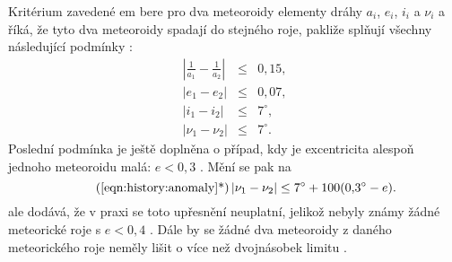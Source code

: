 Kritérium zavedené \citeauthor{radiosurvey}em bere pro dva meteoroidy elementy dráhy $a_i$, $e_i$, $i_i$ a $\nu_i$ a říká, že tyto dva meteoroidy spadají do stejného roje, pakliže splňují všechny následující podmínky \cite{radiosurvey}:
\begin{eqnarray}
    \left|\frac{1}{a_1}-\frac{1}{a_2}\right| &\le& 0{,}15 \text{,}\\
    \left|e_1-e_2\right| &\le& 0{,}07 \text{,}\\
    \left|i_1-i_2\right| &\le& 7^\circ \text{,}\\
    \left|\nu_1-\nu_2\right| &\le& 7^\circ \label{eqn:history:anomaly}\text{.}
\end{eqnarray}
Poslední podmínka je ještě doplněna o případ, kdy je excentricita alespoň jednoho meteoroidu malá: $e<0{,}3$ \cite{radiosurvey}. Mění se pak na \cite{radiosurvey}
\begin{equation}
    \tag{\ref{eqn:history:anomaly}*}
    \left|\nu_1-\nu_2\right| \le 7^\circ+100(0{,}3^\circ-e)\text{.}
\end{equation}
\citeauthor{radiosurvey} ale dodává, že v praxi se toto upřesnění neuplatní, jelikož nebyly známy žádné meteorické roje s $e<0{,}4$ \cite{radiosurvey}. Dále by se žádné dva meteoroidy z daného meteorického roje neměly lišit o více než dvojnásobek limitu \cite{radiosurvey}.

